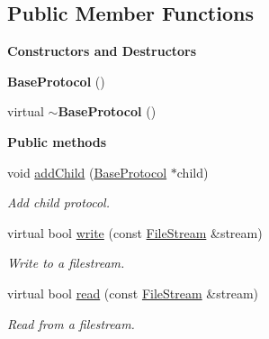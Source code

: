 \subsection*{Public Member Functions}
\begin{Indent}\textbf{ Constructors and Destructors}\par
\begin{DoxyCompactItemize}
\item 
\mbox{\label{classrev_1_1_base_protocol_a84c35efe6eab77ace5c3746bb2ad8314}} 
{\bfseries Base\+Protocol} ()
\item 
\mbox{\label{classrev_1_1_base_protocol_a36baaa195b3116e6e801ca8205ad4901}} 
virtual {\bfseries $\sim$\+Base\+Protocol} ()
\end{DoxyCompactItemize}
\end{Indent}
\begin{Indent}\textbf{ Public methods}\par
\begin{DoxyCompactItemize}
\item 
\mbox{\label{classrev_1_1_base_protocol_a081f9beb0c0e31ab423c6f058c0ce394}} 
void \mbox{\hyperlink{classrev_1_1_base_protocol_a081f9beb0c0e31ab423c6f058c0ce394}{add\+Child}} (\mbox{\hyperlink{classrev_1_1_base_protocol}{Base\+Protocol}} $\ast$child)
\begin{DoxyCompactList}\small\item\em Add child protocol. \end{DoxyCompactList}\item 
\mbox{\label{classrev_1_1_base_protocol_a0b59760ff81ba9e89d0b7301475dc477}} 
virtual bool \mbox{\hyperlink{classrev_1_1_base_protocol_a0b59760ff81ba9e89d0b7301475dc477}{write}} (const \mbox{\hyperlink{classrev_1_1_file_stream}{File\+Stream}} \&stream)
\begin{DoxyCompactList}\small\item\em Write to a filestream. \end{DoxyCompactList}\item 
\mbox{\label{classrev_1_1_base_protocol_a61a4b3ce33404dc376b89fb206580e19}} 
virtual bool \mbox{\hyperlink{classrev_1_1_base_protocol_a61a4b3ce33404dc376b89fb206580e19}{read}} (const \mbox{\hyperlink{classrev_1_1_file_stream}{File\+Stream}} \&stream)
\begin{DoxyCompactList}\small\item\em Read from a filestream. \end{DoxyCompactList}\end{DoxyCompactItemize}
\end{Indent}
